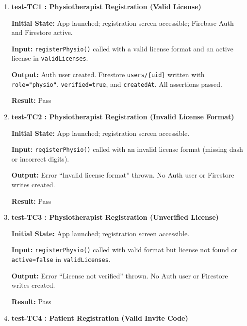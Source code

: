 \documentclass[12pt, titlepage]{article}
\begin{document}
\begin{enumerate}
	
	\item \textbf{test-TC1 : Physiotherapist Registration (Valid License)}
	
	\textbf{Initial State:} App launched; registration screen accessible; Firebase Auth and Firestore active.
	
	\textbf{Input:} \texttt{registerPhysio()} called with a valid license format and an active license in \texttt{validLicenses}.
	
	\textbf{Output:} Auth user created. Firestore \texttt{users/\{uid\}} written with \texttt{role="physio"}, \texttt{verified=true}, and \texttt{createdAt}. All assertions passed.
	
	\textbf{Result:} Pass
	
	\vspace{0.5em}
	
	\item \textbf{test-TC2 : Physiotherapist Registration (Invalid License Format)}
	
	\textbf{Initial State:} App launched; registration screen accessible.
	
	\textbf{Input:} \texttt{registerPhysio()} called with an invalid license format (missing dash or incorrect digits).
	
	\textbf{Output:} Error ``Invalid license format'' thrown. No Auth user or Firestore writes created.
	
	\textbf{Result:} Pass
	
	\vspace{0.5em}
	
	\item \textbf{test-TC3 : Physiotherapist Registration (Unverified License)}
	
	\textbf{Initial State:} App launched; registration screen accessible.
	
	\textbf{Input:} \texttt{registerPhysio()} called with valid format but license not found or \texttt{active=false} in \texttt{validLicenses}.
	
	\textbf{Output:} Error ``License not verified'' thrown. No Auth user or Firestore writes created.
	
	\textbf{Result:} Pass
	
	\vspace{0.5em}
	
	\item \textbf{test-TC4 : Patient Registration (Valid Invite Code)}
	

\end{enumerate}
\end{document}
